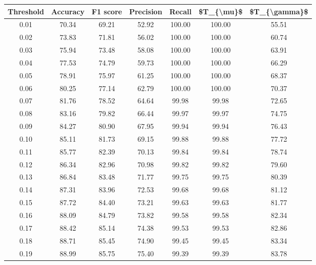 \begin{tabular}{|c|c|c|c|c|c|c|}
\hline
 Threshold &  Accuracy &  F1 score &  Precision &  Recall &  \$T\_\{\textbackslash mu\}\$ &  \$T\_\{\textbackslash gamma\}\$ \\
\hline
      0.01 &     70.34 &     69.21 &      52.92 &  100.00 &     100.00 &         55.51 \\
      0.02 &     73.83 &     71.81 &      56.02 &  100.00 &     100.00 &         60.74 \\
      0.03 &     75.94 &     73.48 &      58.08 &  100.00 &     100.00 &         63.91 \\
      0.04 &     77.53 &     74.79 &      59.73 &  100.00 &     100.00 &         66.29 \\
      0.05 &     78.91 &     75.97 &      61.25 &  100.00 &     100.00 &         68.37 \\
      0.06 &     80.25 &     77.14 &      62.79 &  100.00 &     100.00 &         70.37 \\
      0.07 &     81.76 &     78.52 &      64.64 &   99.98 &      99.98 &         72.65 \\
      0.08 &     83.16 &     79.82 &      66.44 &   99.97 &      99.97 &         74.75 \\
      0.09 &     84.27 &     80.90 &      67.95 &   99.94 &      99.94 &         76.43 \\
      0.10 &     85.11 &     81.73 &      69.15 &   99.88 &      99.88 &         77.72 \\
      0.11 &     85.77 &     82.39 &      70.13 &   99.84 &      99.84 &         78.74 \\
      0.12 &     86.34 &     82.96 &      70.98 &   99.82 &      99.82 &         79.60 \\
      0.13 &     86.84 &     83.48 &      71.77 &   99.75 &      99.75 &         80.39 \\
      0.14 &     87.31 &     83.96 &      72.53 &   99.68 &      99.68 &         81.12 \\
      0.15 &     87.72 &     84.40 &      73.21 &   99.63 &      99.63 &         81.77 \\
      0.16 &     88.09 &     84.79 &      73.82 &   99.58 &      99.58 &         82.34 \\
      0.17 &     88.42 &     85.14 &      74.38 &   99.53 &      99.53 &         82.86 \\
      0.18 &     88.71 &     85.45 &      74.90 &   99.45 &      99.45 &         83.34 \\
      0.19 &     88.99 &     85.75 &      75.40 &   99.39 &      99.39 &         83.78 \\

\end{tabular}
